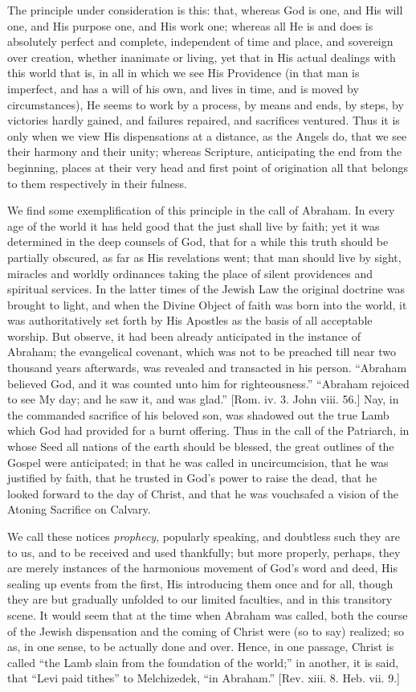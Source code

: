 The principle under consideration is this: that, whereas God is
one, and His will one, and His purpose one, and His work one; whereas
all He is and does is absolutely perfect and complete, independent of
time and place, and sovereign over creation, whether inanimate or
living, yet that in His actual dealings with this world that is, in
all in which we see His Providence (in that man is imperfect, and has
a will of his own, and lives in time, and is moved by circumstances),
He seems to work by a process, by means and ends, by steps, by
victories hardly gained, and failures repaired, and sacrifices
ventured. Thus it is only when we view His dispensations at a
distance, as the Angels do, that we see their harmony and their unity;
whereas Scripture, anticipating the end from the beginning, places at
their very head and first point of origination all that belongs to
them respectively in their fulness.

We find some exemplification of this principle in the call of
Abraham. In every age of the world it has held good that the just
shall live by faith; yet it was determined in the deep counsels of
God, that for a while this truth should be partially obscured, as far
as His revelations went; that man should live by sight, miracles and
worldly ordinances taking the place of silent providences and
spiritual services. In the latter times of the Jewish Law the original
doctrine was brought to light, and when the Divine Object of faith was
born into the world, it was authoritatively set forth by His Apostles
as the basis of all acceptable worship. But observe, it had been
already anticipated in the instance of Abraham; the evangelical
covenant, which was not to be preached till near two thousand years
afterwards, was revealed and transacted in his person. ``Abraham
believed God, and it was counted unto him for righteousness.''
``Abraham rejoiced to see My day; and he saw it, and was
glad.'' [Rom. iv. 3. John viii. 56.] Nay, in the commanded
sacrifice of his beloved son, was shadowed out the true Lamb which God
had provided for a burnt offering. Thus in the call of the Patriarch,
in whose Seed all nations of the earth should be blessed, the great
outlines of the Gospel were anticipated; in that he was called in
uncircumcision, that he was justified by faith, that he trusted in
God's power to raise the dead, that he looked forward to the day of
Christ, and that he was vouchsafed a vision of the Atoning Sacrifice
on Calvary.

We call these notices \emph{prophecy}, popularly speaking, and
doubtless such they are to us, and to be received and used thankfully;
but more properly, perhaps, they are merely instances of the
harmonious movement of God's word and deed, His sealing up events from
the first, His introducing them once and for all, though they are but
gradually unfolded to our limited faculties, and in this transitory
scene. It would seem that at the time when Abraham was called, both
the course of the Jewish dispensation and the coming of Christ were
(so to say) realized; so as, in one sense, to be actually done and
over. Hence, in one passage, Christ is called ``the Lamb slain
from the foundation of the world;'' in another, it is said, that
``Levi paid tithes'' to Melchizedek, ``in Abraham.''
[Rev. xiii. 8. Heb. vii. 9.]

